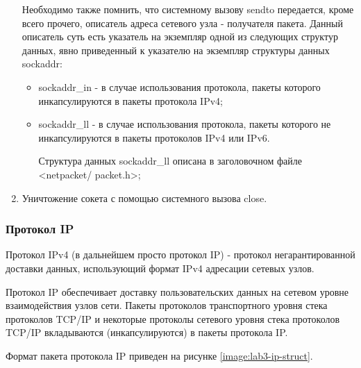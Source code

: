 \begin{enumerate}
\begin{enumerate}
			\end{enumerate}

			Необходимо также помнить, что системному вызову sendto передается, кроме всего прочего, описатель адреса сетевого узла - получателя пакета.
			Данный описатель суть есть указатель на экземпляр одной из следующих структур данных, явно приведенный к указателю на экземпляр структуры данных
			sockaddr:

			\begin{itemize}

				\item sockaddr\_in - в случае использования протокола, пакеты которого инкапсулируются в пакеты протокола IPv4;
				\item sockaddr\_ll - в случае использования протокола, пакеты которого не инкапсулируются в пакеты протоколов IPv4 или IPv6.
				
				Структура данных sockaddr\_ll описана в заголовочном файле <netpacket/ packet.h>; 

			\end{itemize}

		\item Уничтожение сокета с помощью системного вызова close.
	
	\end{enumerate}

\subsubsection{Протокол IP}
	
	Протокол IPv4 (в дальнейшем просто протокол IP) - протокол негарантированной доставки данных, использующий формат IPv4 адресации сетевых узлов.

	Протокол IP обеспечивает доставку пользовательских данных на сетевом уровне взаимодействия узлов сети. Пакеты протоколов транспортного уровня
	стека протоколов TCP/IP и некоторые протоколы сетевого уровня стека протоколов TCP/IP вкладываются (инкапсулируются) в пакеты протокола IP.

	Формат пакета протокола IP приведен на рисунке \ref{image:lab3-ip-struct}.

